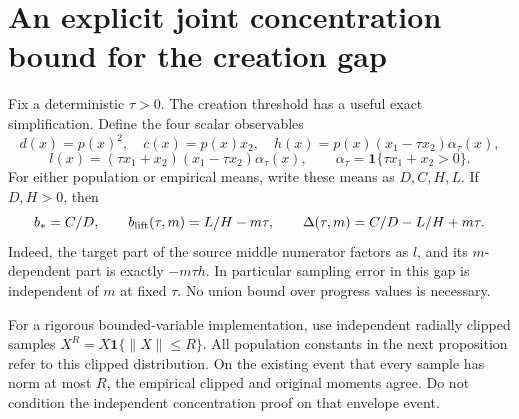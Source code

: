 \documentclass{article} %
\theoremstyle{plain}
\theoremstyle{definition}
\theoremstyle{remark}
\begin{document}
\section{An explicit joint concentration bound for the creation gap}
\label{sbgen:joint-section}

Fix a deterministic $\tau>0$. The creation threshold has a useful exact
simplification. Define the four scalar observables
\[
 d(x)=p(x)^2,\quad c(x)=p(x)x_2,\quad
 h(x)=p(x)(x_1-\tau x_2)\alpha_\tau(x),
\]
\[
 l(x)=(\tau x_1+x_2)(x_1-\tau x_2)\alpha_\tau(x),
 \qquad\alpha_\tau=\mathbf1\{\tau x_1+x_2>0\}.
\]
For either population or empirical means, write these means as
$D,C,H,L$. If $D,H>0$, then
\begin{equation}\label{sbgen:gap-affine}
 b_*=C/D,\qquad b_{\rm lift}(\tau,m)=L/H-m\tau,
 \qquad\Delta(\tau,m)=C/D-L/H+m\tau.
\end{equation}
Indeed, the target part of the source middle numerator factors as $l$,
and its $m$-dependent part is exactly $-m\tau h$.
In particular sampling error in this gap is independent of $m$ at fixed
$\tau$. No union bound over progress values is necessary.

For a rigorous bounded-variable implementation, use independent
radially clipped samples $X^R=X\mathbf1\{\|X\|\le R\}$. All population
constants in the next proposition refer to this clipped distribution.
On the existing event that every sample has norm at most $R$, the
empirical clipped and original moments agree. Do not condition the
independent concentration proof on that envelope event.
\end{document}
